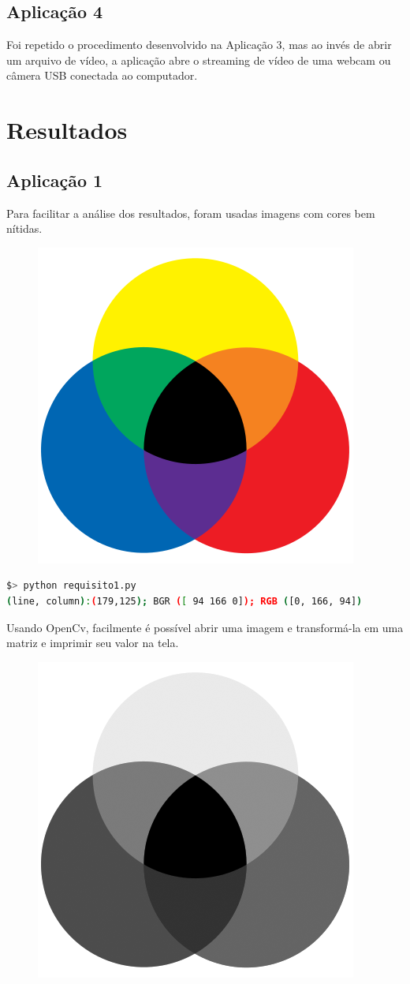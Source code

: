 \documentclass[conference]{IEEEtran}
\begin{document}
\subsection*{Aplicação 4}
Foi repetido o procedimento desenvolvido na Aplicação 3, mas ao invés de abrir um arquivo de vídeo, a aplicação abre o streaming de vídeo de uma webcam ou câmera USB conectada ao computador.
\section{Resultados}
\subsection*{Aplicação 1}
Para facilitar a análise dos resultados, foram usadas imagens com cores bem nítidas.
\begin{figure}[ht!]
\begin{center}
\includegraphics[width=0.28\columnwidth]{venn.png}
\end{center}
\end{figure}
\begin{lstlisting}[language=bash]
$> python requisito1.py
(line, column):(179,125); BGR ([ 94 166 0]); RGB ([0, 166, 94])
\end{lstlisting}

Usando OpenCv, facilmente é possível abrir uma imagem e transformá-la em uma matriz e imprimir seu valor na tela.

\begin{figure}[ht!]
\begin{center}
\includegraphics[width=0.28\columnwidth]{venn_gray.png}
\end{center}
\end{figure}
\end{document}
